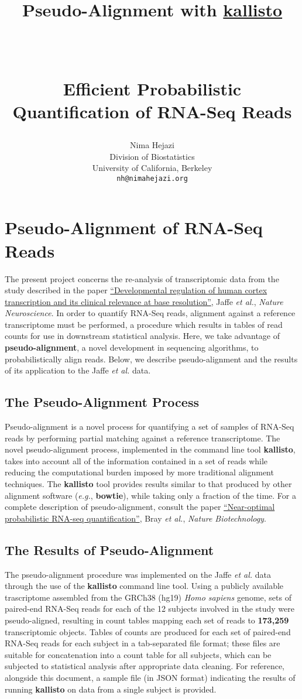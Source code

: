 \documentclass[paper=a4, fontsize=11pt]{scrartcl} %
\title{ \vspace{-1in} \usefont{OT1}{bch}{b}{n}
\huge \strut Pseudo-Alignment with
{\href{https://pachterlab.github.io/kallisto/about}{kallisto}} \strut \\
\Large \bfseries \strut Efficient Probabilistic Quantification of RNA-Seq Reads
  \strut
}
\author{ \usefont{OT1}{bch}{m}{n}
        Nima Hejazi\\ \usefont{OT1}{bch}{m}{n}
        Division of Biostatistics\\
        University of California, Berkeley\\ \usefont{OT1}{bch}{m}{n}
        \texttt{nh@nimahejazi.org}
}
\date{}
\begin{document}
\maketitle
\section{Pseudo-Alignment of RNA-Seq Reads}
The present project concerns the re-analysis of transcriptomic data from the
study described in the paper
{\href{http://www.nature.com/neuro/journal/v18/n1/abs/nn.3898.html}{``Developmental
regulation of human cortex transcription and its clinical relevance at base
resolution''}}, Jaffe \textit{et al.}, \textit{Nature Neuroscience}. In order to
quantify RNA-Seq reads, alignment against a reference transcriptome must be
performed, a procedure which results in tables of read counts for use in
downstream statistical analysis. Here, we take advantage of
\textbf{pseudo-alignment}, a novel development in sequencing algorithms, to
probabilistically align reads. Below, we describe pseudo-alignment and the
results of its application to the Jaffe \textit{et al.} data.

\subsection{The Pseudo-Alignment Process}
Pseudo-alignment is a novel process for quantifying a set of samples of RNA-Seq
reads by performing partial matching against a reference transcriptome. The
novel pseudo-alignment process, implemented in the command line tool
\textbf{kallisto}, takes into account all of the information contained in a set
of reads while reducing the computational burden imposed by more traditional
alignment techniques. The \textbf{kallisto} tool provides results similar to
that produced by other alignment software (\textit{e.g.}, \textbf{bowtie}),
while taking only a fraction of the time. For a complete description of
pseudo-alignment, consult the paper
{\href{http://www.nature.com/nbt/journal/v34/n5/full/nbt.3519.html}{``Near-optimal
probabilistic RNA-seq quantification''}}, Bray \textit{et al.}, \textit{Nature
Biotechnology}.

\subsection{The Results of Pseudo-Alignment}
The pseudo-alignment procedure was implemented on the Jaffe \textit{et al.} data
through the use of the \textbf{kallisto} command line tool. Using a publicly
available trascriptome assembled from the GRCh38 (hg19) \textit{Homo sapiens}
genome, sets of paired-end RNA-Seq reads for each of the 12 subjects involved in
the study were pseudo-aligned, resulting in count tables mapping each set of
reads to \textbf{173,259} transcriptomic objects. Tables of counts are produced
for each set of paired-end RNA-Seq reads for each subject in a tab-separated
file format; these files are suitable for concatenation into a count table for
all subjects, which can be subjected to statistical analysis after appropriate
data cleaning. For reference, alongside this document, a sample file (in JSON
format) indicating the results of running \textbf{kallisto} on data from a
single subject is provided.
\end{document}
